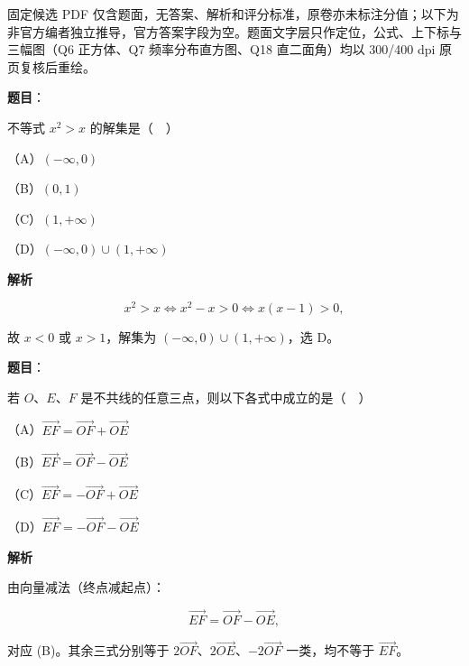 

\begin{gktip}
固定候选 PDF 仅含题面，无答案、解析和评分标准，原卷亦未标注分值；以下为非官方编者独立推导，官方答案字段为空。题面文字层只作定位，公式、上下标与三幅图（Q6 正方体、Q7 频率分布直方图、Q18 直二面角）均以 300/400 dpi 原页复核后重绘。
\end{gktip}

\begin{answer}

\textbf{题目}：

不等式 $x^2>x$ 的解集是（　）

（A）$(-\infty,0)$

（B）$(0,1)$

（C）$(1,+\infty)$

（D）$(-\infty,0)\cup(1,+\infty)$

\textbf{解析}

\nopagebreak[4]
\[x^2>x\iff x^2-x>0\iff x(x-1)>0,\]

故 $x<0$ 或 $x>1$，解集为 $(-\infty,0)\cup(1,+\infty)$，选 D。


\end{answer}
\begin{answer}

\textbf{题目}：

若 $O$、$E$、$F$ 是不共线的任意三点，则以下各式中成立的是（　）

（A）$\overrightarrow{EF}=\overrightarrow{OF}+\overrightarrow{OE}$

（B）$\overrightarrow{EF}=\overrightarrow{OF}-\overrightarrow{OE}$

（C）$\overrightarrow{EF}=-\overrightarrow{OF}+\overrightarrow{OE}$

（D）$\overrightarrow{EF}=-\overrightarrow{OF}-\overrightarrow{OE}$

\textbf{解析}

由向量减法（终点减起点）：

\nopagebreak[4]
\[\overrightarrow{EF}=\overrightarrow{OF}-\overrightarrow{OE},\]

对应 (B)。其余三式分别等于 $2\overrightarrow{OF}$、$2\overrightarrow{OE}$、$-2\overrightarrow{OF}$ 一类，均不等于 $\overrightarrow{EF}$。


\end{answer}
